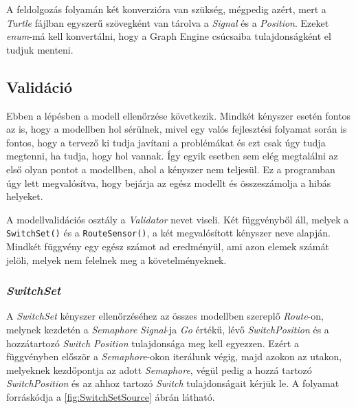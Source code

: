A feldolgozás folyamán két konverzióra van szükség, mégpedig azért, mert a \emph{Turtle} fájlban egyszerű szövegként van tárolva a \emph{Signal} és a \emph{Position}. Ezeket \emph{enum}-má kell konvertálni, hogy a Graph Engine csúcsaiba tulajdonságként el tudjuk menteni.

\subsection{Validáció}

Ebben a lépésben a modell ellenőrzése következik. Mindkét kényszer esetén fontos az is, hogy a modellben hol sérülnek, mivel egy valós fejlesztési folyamat során is fontos, hogy a tervező ki tudja javítani a problémákat és ezt csak úgy tudja megtenni, ha tudja, hogy hol vannak. Így egyik esetben sem elég megtalálni az első olyan pontot a modellben, ahol a kényszer nem teljesül. Ez a programban úgy lett megvalósítva, hogy bejárja az egész modellt és összeszámolja a hibás helyeket.

A modellvalidációs osztály a \emph{Validator} nevet viseli. Két függvényből áll, melyek a \texttt{SwitchSet()} és a \texttt{RouteSensor()}, a két megvalósított kényszer neve alapján. Mindkét függvény egy egész számot ad eredményül, ami azon elemek számát jelöli, melyek nem felelnek meg a követelményeknek. 

\subsubsection{\emph{SwitchSet}}

A \emph{SwitchSet} kényszer ellenőrzéséhez az összes modellben szereplő \emph{Route}-on, melynek kezdetén a \emph{Semaphore} \emph{Signal}-ja \emph{Go} értékű, lévő \emph{SwitchPosition} és a hozzátartozó \emph{Switch} \emph{Position} tulajdonsága meg kell egyezzen. Ezért a függvényben először a \emph{Semaphore}-okon iterálunk végig, majd azokon az utakon, melyeknek kezdőpontja az adott \emph{Semaphore}, végül pedig a hozzá tartozó \emph{SwitchPosition} és az ahhoz tartozó \emph{Switch} tulajdonságait kérjük le. A folyamat forráskódja a \ref{fig:SwitchSetSource} ábrán látható.

